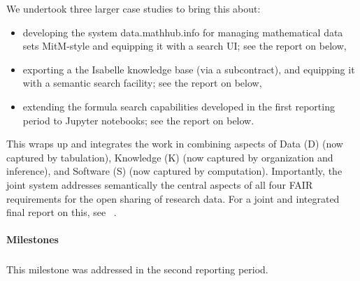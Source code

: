 We undertook three larger case studies to bring this about:
\begin{itemize}
\item developing the system data.mathhub.info for managing mathematical data sets MitM-style and equipping it with a search UI; see the report on  below,
\item exporting a the Isabelle knowledge base (via a subcontract), and equipping it with a semantic search facility; see the report on  below,
\item extending the formula search capabilities developed in the first reporting period to Jupyter notebooks; see the report on
  below.
\end{itemize}
This wraps up and integrates the work in  combining aspects of Data (D) (now captured by tabulation), Knowledge (K) (now captured by organization and inference), and Software (S) (now captured by computation).
Importantly, the joint system addresses semantically the central aspects of all four FAIR requirements for the open sharing of research data. 
For a joint and integrated final report on this, see ~\cite{ODK-D6.10}.


\paragraph{Milestones}

\subparagraph{}
This milestone was addressed in the second reporting period.
\medskip
%

